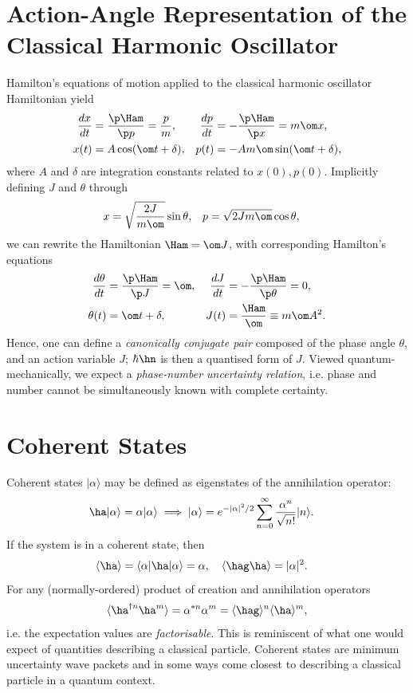 \documentclass[qo.tex]{subfiles}
\begin{document}
\section{Action-Angle Representation of the Classical Harmonic Oscillator}
Hamilton's equations of motion applied to the classical harmonic oscillator Hamiltonian yield
\begin{align}
    \frac{dx}{dt} &= \frac{\p \Ham}{\p p} = \frac{p}{m}, & \frac{dp}{dt} &= -\frac{\p\Ham}{\p x}=m\om x,\\
    x(t) &= A\cos(\om t+\delta), & p(t) &= -Am\om\sin(\om t+\delta),
\end{align}
where $A$ and $\delta$ are integration constants related to $x(0),p(0)$.
Implicitly defining $J$ and $\theta$ through
\begin{align}
    x &= \sqrt{\frac{2J}{m\om}}\sin\theta, & p &= \sqrt{2Jm\om}\cos\theta,
\end{align}
we can rewrite the Hamiltonian $\Ham =\om J$, with corresponding Hamilton's equations
\begin{align}
    \frac{d\theta}{dt} &= \frac{\p\Ham}{\p J} = \om, & \frac{dJ}{dt} &= -\frac{\p\Ham}{\p\theta} = 0,\\
    \theta(t) &= \om t+\delta, & J(t) &= \frac{\Ham}{\om}\equiv m\om A^2.
\end{align}
Hence, one can define a \emph{canonically conjugate pair} composed of the phase angle $\theta$, and an action variable $J$; $\hbar\hn$ is then a quantised form of $J$.
Viewed quantum-mechanically, we expect a \emph{phase-number uncertainty relation}, i.e. phase and number cannot be simultaneously known with complete certainty. 

\section{Coherent States}
Coherent states $|\alpha\rangle$ may be defined as eigenstates of the annihilation operator:
\begin{align}
    \ha|\alpha\rangle &= \alpha|\alpha\rangle \implies |\alpha\rangle = e^{-|\alpha|^2/2}\sum_{n=0}^\infty \frac{\alpha^n}{\sqrt{n!}}|n\rangle.
\end{align}
If the system is in a coherent state, then 
\begin{align}
    \langle\ha\rangle &= \langle\alpha|\ha|\alpha\rangle = \alpha,\quad \langle\hag\ha\rangle = |\alpha|^2.
\end{align}
For any (normally-ordered) product of creation and annihilation operators
\begin{align}
    \langle\ha^{\dagger n}\ha^m\rangle = \alpha^{*n}\alpha^m = \langle\hag\rangle^n\langle\ha\rangle^m,
\end{align}
i.e. the expectation values are \emph{factorisable}.
This is reminiscent of what one would expect of quantities describing a classical particle. 
Coherent states are minimum uncertainty wave packets and in some ways come closest to describing a classical particle in a quantum context.
\end{document}
